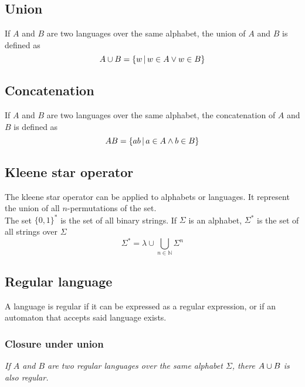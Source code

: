 \documentclass{article}
\newcommand{\emptyString}{\lambda}
\begin{document}
\subsection{Union}

If \(A\) and \(B\) are two languages over the same alphabet,
the union of \(A\) and \(B\) is defined as
\[
    A \cup B = \{w \,|\, w \in A \lor w \in B\}
\]

\subsection{Concatenation}

If \(A\) and \(B\) are two languages over the same alphabet,
the concatenation of \(A\) and \(B\) is defined as
\[
    AB = \{ab \,|\, a \in A \land b \in B\}
\]

\subsection{Kleene star operator}

The kleene star operator can be applied to alphabets or languages.
It represent the union of all \(n\)-permutations of the set. \\
The set \(\{0,1\}^*\) is the set of
all binary strings. If \(\Sigma\) is an alphabet, \(\Sigma^*\) is the set
of all strings over \(\Sigma\)
\[
    \Sigma^* = \emptyString \cup \bigcup_{n\in\mathbb{N}} \Sigma^n
\]

\subsection{Regular language}

A language is regular if it can be expressed as a regular expression,
or if an automaton that accepts said language exists.

\subsubsection{Closure under union}

\textit{If \(A\) and \(B\) are two regular languages over the same alphabet
\(\Sigma\), there \(A \cup B\) is also regular.}
\end{document}
